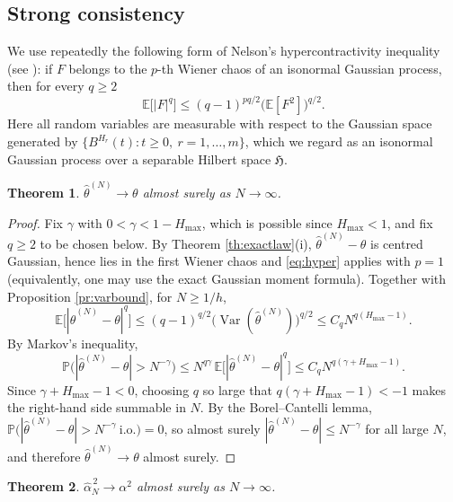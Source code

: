 \documentclass[11pt,reqno]{amsart}
\numberwithin{equation}{section}
\theoremstyle{plain}
\newtheorem{theorem}{Theorem}[section]
\theoremstyle{definition}
\theoremstyle{remark}
\newcommand{\Hmax}{H_{\max}}
\newcommand{\Prob}{\mathbb{P}}
\newcommand{\E}{\mathbb{E}}
\newcommand{\Hi}{\mathfrak{H}}
\DeclareMathOperator{\Var}{Var}
\begin{document}
\subsection{Strong consistency}
We use repeatedly the following form of Nelson's hypercontractivity inequality (see
\cite[Thm.~2.7.2]{NP12}): if $F$ belongs to the $p$-th Wiener chaos of an isonormal
Gaussian process, then for every $q\ge2$
\begin{equation}\label{eq:hyper}
  \E\bigl[|F|^{q}\bigr]\le(q-1)^{pq/2}\bigl(\E[F^{2}]\bigr)^{q/2}.
\end{equation}
Here all random variables are measurable with respect to the Gaussian space generated by
$\{B^{H_r}(t):t\ge0,\ r=1,\dots,m\}$, which we regard as an isonormal Gaussian process
over a separable Hilbert space $\Hi$.

\begin{theorem}\label{th:sctheta}
$\widehat\theta^{(N)}\to\theta$ almost surely as $N\to\infty$.
\end{theorem}

\begin{proof}
Fix $\gamma$ with $0<\gamma<1-\Hmax$, which is possible since $\Hmax<1$, and fix $q\ge2$
to be chosen below. By Theorem \ref{th:exactlaw}(i), $\widehat\theta^{(N)}-\theta$ is
centred Gaussian, hence lies in the first Wiener chaos and \eqref{eq:hyper} applies with
$p=1$ (equivalently, one may use the exact Gaussian moment formula). Together with
Proposition \ref{pr:varbound}, for $N\ge1/h$,
\[
  \E\bigl[|\widehat\theta^{(N)}-\theta|^{q}\bigr]
  \le(q-1)^{q/2}\bigl(\Var(\widehat\theta^{(N)})\bigr)^{q/2}
  \le C_qN^{q(\Hmax-1)} .
\]
By Markov's inequality,
\[
  \Prob\bigl(|\widehat\theta^{(N)}-\theta|>N^{-\gamma}\bigr)
  \le N^{q\gamma}\,\E\bigl[|\widehat\theta^{(N)}-\theta|^{q}\bigr]
  \le C_qN^{q(\gamma+\Hmax-1)} .
\]
Since $\gamma+\Hmax-1<0$, choosing $q$ so large that $q(\gamma+\Hmax-1)<-1$ makes the
right-hand side summable in $N$. By the Borel--Cantelli lemma,
$\Prob\bigl(|\widehat\theta^{(N)}-\theta|>N^{-\gamma}\ \text{i.o.}\bigr)=0$, so almost
surely $|\widehat\theta^{(N)}-\theta|\le N^{-\gamma}$ for all large $N$, and therefore
$\widehat\theta^{(N)}\to\theta$ almost surely.
\end{proof}

\begin{theorem}\label{th:scalpha}
$\widehat\alpha^{\,2}_N\to\alpha^{2}$ almost surely as $N\to\infty$.
\end{theorem}
\end{document}
